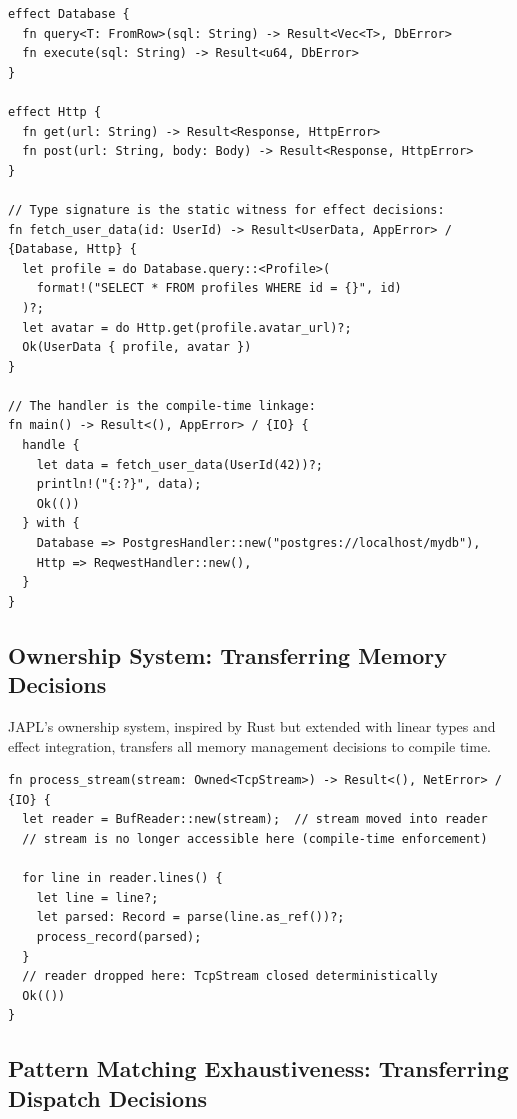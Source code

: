 \documentclass[11pt]{article}
\begin{document}
\begin{lstlisting}[caption={JAPL effect system as decision transfer}]
effect Database {
  fn query<T: FromRow>(sql: String) -> Result<Vec<T>, DbError>
  fn execute(sql: String) -> Result<u64, DbError>
}

effect Http {
  fn get(url: String) -> Result<Response, HttpError>
  fn post(url: String, body: Body) -> Result<Response, HttpError>
}

// Type signature is the static witness for effect decisions:
fn fetch_user_data(id: UserId) -> Result<UserData, AppError> / {Database, Http} {
  let profile = do Database.query::<Profile>(
    format!("SELECT * FROM profiles WHERE id = {}", id)
  )?;
  let avatar = do Http.get(profile.avatar_url)?;
  Ok(UserData { profile, avatar })
}

// The handler is the compile-time linkage:
fn main() -> Result<(), AppError> / {IO} {
  handle {
    let data = fetch_user_data(UserId(42))?;
    println!("{:?}", data);
    Ok(())
  } with {
    Database => PostgresHandler::new("postgres://localhost/mydb"),
    Http => ReqwestHandler::new(),
  }
}
\end{lstlisting}

\subsection{Ownership System: Transferring Memory Decisions}

JAPL's ownership system, inspired by Rust but extended with linear types and effect
integration, transfers all memory management decisions to compile time.

\begin{lstlisting}[caption={JAPL ownership as decision transfer}]
fn process_stream(stream: Owned<TcpStream>) -> Result<(), NetError> / {IO} {
  let reader = BufReader::new(stream);  // stream moved into reader
  // stream is no longer accessible here (compile-time enforcement)

  for line in reader.lines() {
    let line = line?;
    let parsed: Record = parse(line.as_ref())?;
    process_record(parsed);
  }
  // reader dropped here: TcpStream closed deterministically
  Ok(())
}
\end{lstlisting}

\subsection{Pattern Matching Exhaustiveness: Transferring Dispatch Decisions}
\end{document}

